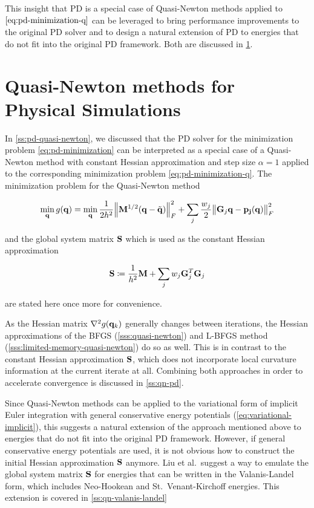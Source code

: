 This insight that PD is a special case of Quasi-Newton methods applied to $\autoref{eq:pd-minimization-q}$ can be leveraged to
bring performance improvements to the original PD solver and to design a natural extension of PD to energies that do not fit 
into the original PD framework. Both are discussed in \cref{s:qn-rts}.

\section{Quasi-Newton methods for Physical Simulations}\label{s:qn-rts}
In \cref{ss:pd-quasi-newton}, we discussed that the PD solver for the minimization problem \autoref{eq:pd-minimization}
can be interpreted as a special case of a Quasi-Newton method with constant Hessian approximation and step size $\alpha = 1$
applied to the corresponding minimization problem \autoref{eq:pd-minimization-q}. The minimization problem for the Quasi-Newton
method

\begin{equation}\label{eq:pd-minimization-q2}
    \min_{\mathbf{q}} g(\mathbf{q}) = 
    \min_{\mathbf{q}} \frac{1}{2h^2} \norm{\mathbf{M}^{1/2}(\mathbf{q} - \tilde{\mathbf{q}})}^2_F + \sum_j \frac{w_j}{2} \norm{\mathbf{G}_j\mathbf{q}
    - \mathbf{p_j}(\mathbf{q})}^2_F
\end{equation}

\noindent and the global system matrix $\mathbf{S}$ which is used as the constant Hessian approximation

\begin{equation}\label{eq:global-matrix}
    \mathbf{S} \coloneqq \frac{1}{h^2}\mathbf{M} + \sum_j w_j \mathbf{G}_j^T \mathbf{G}_j  
\end{equation}

\noindent are stated here once more for convenience.

As the Hessian matrix $\nabla^2 g(\mathbf{q}_k)$ generally changes between iterations, the Hessian approximations of the 
BFGS (\cref{sss:quasi-newton}) and L-BFGS method (\cref{sss:limited-memory-quasi-newton}) do so as well.
This is in contrast to the constant Hessian approximation $\mathbf{S}$, which does not incorporate local curvature information
at the current iterate at all. Combining both approaches in order to accelerate convergence is discussed 
in \cref{ss:qn-pd}.

Since Quasi-Newton methods can be applied to the variational form of 
implicit Euler integration with general conservative energy potentials (\cref{eq:variational-implicit}), this suggests a 
natural extension of the approach mentioned above to energies that do not fit into the original PD framework. However,
if general conservative energy potentials are used, it is not obvious how to construct the initial Hessian approximation
$\mathbf{S}$ anymore. Liu et al.\ suggest a way to emulate the global system matrix $\mathbf{S}$ for energies that can be written in
the Valanis-Landel form, which includes Neo-Hookean and St.\ Venant-Kirchoff energies. This extension is covered in 
\cref{ss:qn-valanis-landel}

